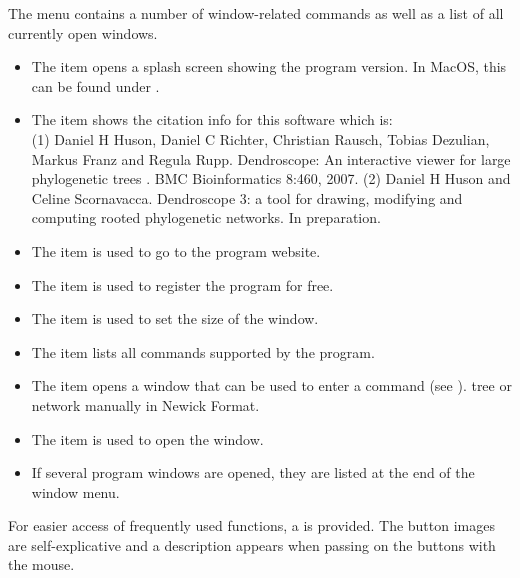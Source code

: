 \documentclass[11pt]{article}
\begin{document}
The  menu contains a number of window-related commands
as well as a list of all currently open windows.
\begin{itemize}
\item The  item opens a splash screen showing the program version. In MacOS, this can be found under .
\item The  item shows the citation info for this software which is:\\
(1) Daniel H Huson, Daniel C Richter, Christian Rausch, Tobias Dezulian, Markus Franz and Regula Rupp. Dendroscope: An interactive viewer for large phylogenetic trees . BMC Bioinformatics 8:460, 2007. (2) Daniel H Huson and Celine Scornavacca.  Dendroscope 3: a tool for drawing, modifying and computing rooted phylogenetic networks. In preparation.
	\item The  item is used to go to the program website.
\item The  item is used to register the program for free.
\item The  item is used to set the
size of the  window.
\item The  item lists all commands supported by the program.
\item The  item opens a window that can be used to enter a command (see ).
tree or network manually in Newick Format. 
\item The  item is used to open the  window.
\item If several program windows are opened, they are listed at the end of the window menu.
\end{itemize}

For easier access of frequently used functions, a  is provided.
The button images are self-explicative and a description appears when passing on the buttons with the mouse.

\end{document}
